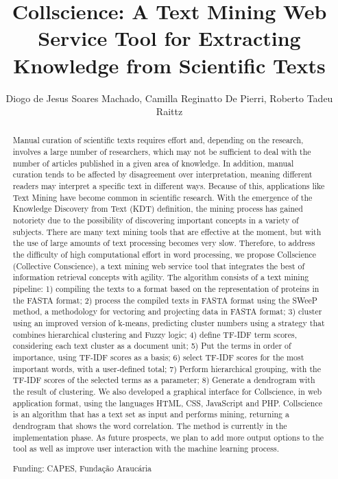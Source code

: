 \documentclass[twoside]{article}
\title{\vspace{-15mm}\fontsize{24pt}{10pt}\selectfont\textbf{ Collscience: A Text Mining Web Service Tool for Extracting Knowledge from Scientific Texts }} %
\author{ Diogo de Jesus Soares Machado, Camilla Reginatto De Pierri, Roberto Tadeu Raittz }
\affil{ Federal University of Paran\'a }
\date{}
\begin{document}
  
  
  \maketitle %
  
  
  \thispagestyle{fancy} %
  
  
  \begin{abstract}
  Manual curation of scientific texts requires effort and,  depending on the research,  involves a large number of researchers,  which may not be sufficient to deal with the number of articles published in a given area of knowledge. In addition,  manual curation tends to be affected by disagreement over interpretation,  meaning different readers may interpret a specific text in different ways. Because of this,  applications like Text Mining have become common in scientific research. With the emergence of the Knowledge Discovery from Text (KDT) definition,  the mining process has gained notoriety due to the possibility of discovering important concepts in a variety of subjects. There are many text mining tools that are effective at the moment,  but with the use of large amounts of text processing becomes very slow. Therefore,  to address the difficulty of high computational effort in word processing,  we propose Collscience (Collective Conscience),  a text mining web service tool that integrates the best of information retrieval concepts with agility. The algorithm consists of a text mining pipeline: 1) compiling the texts to a format based on the representation of proteins in the FASTA format; 2) process the compiled texts in FASTA format using the SWeeP method,  a methodology for vectoring and projecting data in FASTA format; 3) cluster using an improved version of k-means,  predicting cluster numbers using a strategy that combines hierarchical clustering and Fuzzy logic; 4) define TF-IDF term scores,  considering each text cluster as a document unit; 5) Put the terms in order of importance,  using TF-IDF scores as a basis; 6) select TF-IDF scores for the most important words,  with a user-defined total; 7) Perform hierarchical grouping,  with the TF-IDF scores of the selected terms as a parameter; 8) Generate a dendrogram with the result of clustering. We also developed a graphical interface for Collscience,  in web application format,  using the languages HTML,  CSS,  JavaScript and PHP. Collscience is an algorithm that has a text set as input and performs mining,  returning a dendrogram that shows the word correlation. The method is currently in the implementation phase. As future prospects,  we plan to add more output options to the tool as well as improve user interaction with the machine learning process.
  
  Funding: CAPES,  Funda\c{c}\~ao Arauc\'aria \\ 
  \end{abstract}
  
\end{document}
